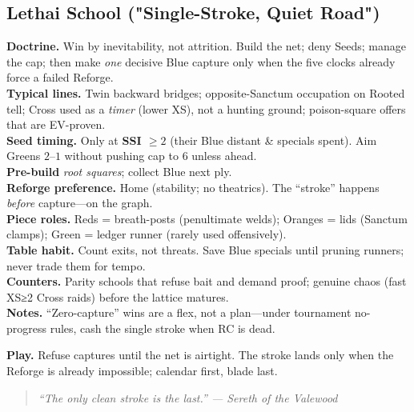 \documentclass[11pt]{article}
\providecommand{\playdesc}[1]{\par\smallskip\noindent\small\textbf{Play.} #1\par}
\newcommand{\flavline}[2]{\noindent\textbf{#1.} \textit{#2}\par}
\begin{document}
\subsection*{Lethai School ("Single-Stroke, Quiet Road")}
\textbf{Doctrine.} Win by inevitability, not attrition. Build the net; deny Seeds; manage the cap; then make \emph{one} decisive Blue capture only when the five clocks already force a failed Reforge. \\
\textbf{Typical lines.} Twin backward bridges; opposite-Sanctum occupation on Rooted tell; Cross used as a \emph{timer} (lower XS), not a hunting ground; poison-square offers that are EV-proven. \\
\textbf{Seed timing.} Only at \textbf{SSI $\ge 2$} (their Blue distant \& specials spent). Aim Greens $2$–$1$ without pushing cap to $6$ unless ahead. \\
\textbf{Pre-build} \emph{root squares}; collect Blue next ply. \\
\textbf{Reforge preference.} Home (stability; no theatrics). The “stroke” happens \emph{before} capture—on the graph. \\
\textbf{Piece roles.} Reds = breath-posts (penultimate welds); Oranges = lids (Sanctum clamps); Green = ledger runner (rarely used offensively). \\
\textbf{Table habit.} Count exits, not threats. Save Blue specials until pruning runners; never trade them for tempo. \\
\textbf{Counters.} Parity schools that refuse bait and demand proof; genuine chaos (fast XS≥2 Cross raids) before the lattice matures. \\
\textbf{Notes.} “Zero-capture” wins are a flex, not a plan—under tournament no-progress rules, cash the single stroke when RC is dead.
\playdesc{Refuse captures until the net is airtight. The stroke lands only when the Reforge is already impossible; calendar first, blade last.}
\providecommand{\flavline}[2]{\noindent\textbf{#1.} \textit{#2}\par}
\begin{quote}\small\itshape
“The only clean stroke is the last.” — Sereth of the Valewood
\end{quote}
\end{document}
